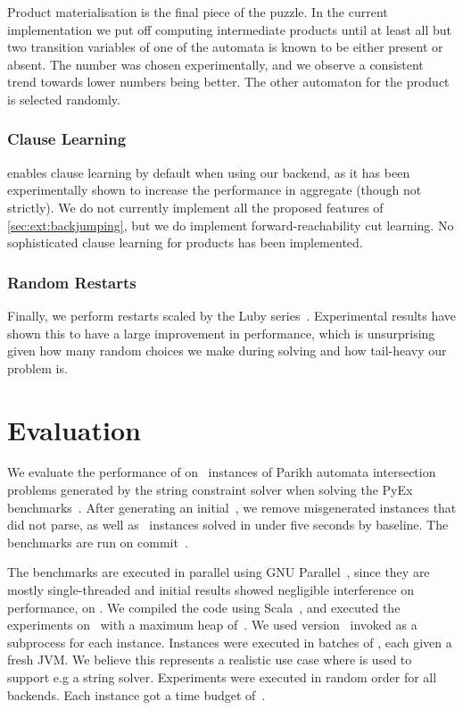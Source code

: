 \documentclass[acmsmall,review,anonymous,screen]{acmart}\settopmatter{printfolios=true,printccs=true,printacmref=true}
\theoremstyle{definition}
\begin{document}
Product materialisation is the final piece of the puzzle. In the current
implementation we put off computing intermediate products until at least all but
two transition variables of one of the automata is known to be either present or
absent. The number was chosen experimentally, and we observe a consistent trend
towards lower numbers being better. The other automaton for the product is
selected randomly.

\subsubsection{Clause Learning}

\Catra{} enables clause learning by default when using our backend, as it has
been experimentally shown to increase the performance in aggregate (though not
strictly). We do not currently implement all the proposed features of
\cref{sec:ext:backjumping}, but we do implement forward-reachability cut
learning. No sophisticated clause learning for products has been implemented.

\subsubsection{Random Restarts}

Finally, we perform restarts scaled by the Luby series~\cite{luby}. Experimental
results have shown this to have a large improvement in performance, which is
unsurprising given how many random choices we make during solving and how
tail-heavy our problem is.

\section{Evaluation}\label{sec:experiments}

We evaluate the performance of \Catra{} on~\NrBenchmarks{} instances of Parikh
automata intersection problems generated by the \OstrichPlus{} string constraint
solver when solving the PyEx benchmarks~\cite{pyex}. After generating an
initial~\InitialNrBenchmarks{}, we remove misgenerated instances that did not
parse, as well as~\NrTrivial{} instances solved in under five seconds by
baseline. The benchmarks are run on commit~\texttt{\commit}.

The benchmarks are executed in parallel using GNU Parallel~\cite{parallel},
since they are mostly single-threaded and initial results showed negligible
interference on performance, on \BenchmarkRig{}. We compiled the code using
Scala~\ScalaVersion{}, and executed the experiments on~\JvmVersion{} with a
maximum heap of~\MaxHeapSize{}. We used \Nuxmv{} version~\NuxmvVersion{} invoked
as a subprocess for each instance. Instances were executed in batches of
\BatchSize{}, each given a fresh JVM. We believe this represents a realistic use
case where \Calculus{} is used to support e.g a string solver. Experiments were
executed in random order for all backends. Each instance got a time budget
of~\RuntimeTimeout.
\end{document}
